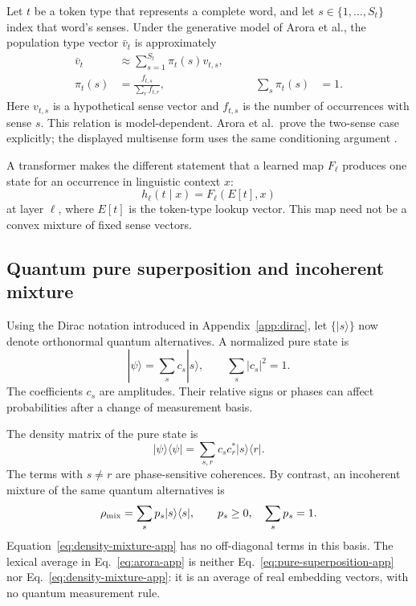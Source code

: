 \documentclass[
  aps,
  reprint,
  superscriptaddress,
  floatfix,
  nofootinbib,
  longbibliography
]{revtex4-2}
\begin{document}
Let $t$ be a token type that represents a complete word, and let
$s\in\{1,\ldots,S_t\}$ index that word's senses.  Under the generative model
of Arora et al., the population type vector $\bar v_t$ is approximately
\begin{equation}
\begin{aligned}
 \bar v_t&\approx\sum_{s=1}^{S_t}\pi_t(s)v_{t,s},\\
 \pi_t(s)&=\frac{f_{t,s}}{\sum_r f_{t,r}},
 &\qquad \sum_s\pi_t(s)&=1.
\end{aligned}
 \label{eq:arora-app}
\end{equation}
Here $v_{t,s}$ is a hypothetical sense vector and $f_{t,s}$ is the number of
occurrences with sense $s$.  This relation is model-dependent.  Arora et al.\
prove the two-sense case explicitly; the displayed multisense form uses the
same conditioning argument
\cite{arora-etal-2018-linear}.

A transformer makes the different statement that a learned map $F_\ell$
produces one state for an occurrence in linguistic context $x$:
\begin{equation}
 h_\ell(t\mid x)=F_\ell(E[t],x)
 \label{eq:context-state-app}
\end{equation}
at layer $\ell$, where $E[t]$ is the token-type lookup vector.  This map need
not be a convex mixture of fixed sense vectors.

\subsection{Quantum pure superposition and incoherent mixture}

Using the Dirac notation introduced in Appendix~\ref{app:dirac}, let
$\{|s\rangle\}$ now denote orthonormal quantum alternatives.  A normalized
pure state is
\begin{equation}
 |\psi\rangle=\sum_s c_s|s\rangle,
 \qquad
 \sum_s|c_s|^2=1.
 \label{eq:pure-superposition-app}
\end{equation}
The coefficients $c_s$ are amplitudes.  Their relative signs or phases can
affect probabilities after a change of measurement basis.

The density matrix of the pure state is
\begin{equation}
 |\psi\rangle\langle\psi|
 =\sum_{s,r}c_s c_r^*|s\rangle\langle r|.
 \label{eq:pure-density-app}
\end{equation}
The terms with $s\ne r$ are phase-sensitive coherences.  By contrast, an
incoherent mixture of the same quantum alternatives is
\begin{equation}
 \rho_{\rm mix}=\sum_s p_s|s\rangle\langle s|,
 \qquad p_s\geq0,\quad\sum_s p_s=1.
 \label{eq:density-mixture-app}
\end{equation}
Equation~\eqref{eq:density-mixture-app} has no off-diagonal terms in this
basis.  The lexical average in Eq.~\eqref{eq:arora-app} is neither
Eq.~\eqref{eq:pure-superposition-app} nor
Eq.~\eqref{eq:density-mixture-app}: it is an average of real embedding
vectors, with no quantum measurement rule.
\end{document}

